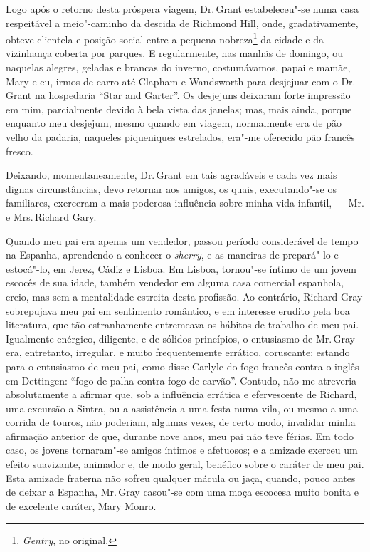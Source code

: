 Logo após o retorno desta próspera viagem, Dr.\,Grant estabeleceu"-se numa
casa respeitável a meio"-caminho da descida de Richmond Hill, onde,
gradativamente, obteve clientela e posição social entre a pequena
nobreza\footnote{\textit{Gentry}, no original.} da cidade e
da vizinhança coberta por parques. E regularmente, nas manhãs de
domingo, ou naquelas alegres, geladas e brancas do inverno,
costumávamos, papai e mamãe, Mary e eu, irmos de carro até Clapham e
Wandsworth para desjejuar com o Dr.\,Grant na hospedaria ``Star and
Garter''. Os desjejuns deixaram forte impressão em mim, parcialmente
devido à bela vista das janelas; mas, mais ainda, porque enquanto meu
desjejum, mesmo quando em viagem, normalmente era de pão velho da
padaria, naqueles piqueniques estrelados, era"-me oferecido pão francês
fresco.

Deixando, momentaneamente, Dr.\,Grant em tais agradáveis e cada vez
mais dignas circunstâncias, devo retornar aos amigos, os quais,
executando"-se os familiares, exerceram a mais poderosa influência sobre
minha vida infantil, --- Mr. e Mrs.\,Richard Gary.

Quando meu pai era apenas um vendedor, passou período considerável de
tempo na Espanha, aprendendo a conhecer o \textit{sherry}, e as maneiras
de prepará"-lo e estocá"-lo, em Jerez, Cádiz e Lisboa. Em Lisboa,
tornou"-se íntimo de um jovem escocês de sua idade, também vendedor em
alguma casa comercial espanhola, creio, mas sem a mentalidade estreita
desta profissão. Ao contrário, Richard Gray sobrepujava meu pai em
sentimento romântico, e em interesse erudito pela boa literatura, que
tão estranhamente entremeava os hábitos de trabalho de meu pai.
Igualmente enérgico, diligente, e de sólidos princípios, o entusiasmo de
Mr.\,Gray era, entretanto, irregular, e muito frequentemente errático,
coruscante; estando para o entusiasmo de meu pai, como disse Carlyle do
fogo francês contra o inglês em Dettingen: ``fogo de palha contra fogo
de carvão''. Contudo, não me atreveria absolutamente a afirmar que, sob
a influência errática e efervescente de Richard, uma excursão a Sintra,
ou a assistência a uma festa numa vila, ou mesmo a uma corrida de
touros, não poderiam, algumas vezes, de certo modo, invalidar minha
afirmação anterior de que, durante nove anos, meu pai não teve férias.
Em todo caso, os jovens tornaram"-se amigos íntimos e afetuosos; e a
amizade exerceu um efeito suavizante, animador e, de modo geral,
benéfico sobre o caráter de meu pai. Esta amizade fraterna não sofreu
qualquer mácula ou jaça, quando, pouco antes de deixar a Espanha, Mr.\,Gray casou"-se com uma moça escocesa muito bonita e de excelente caráter,
Mary Monro.

